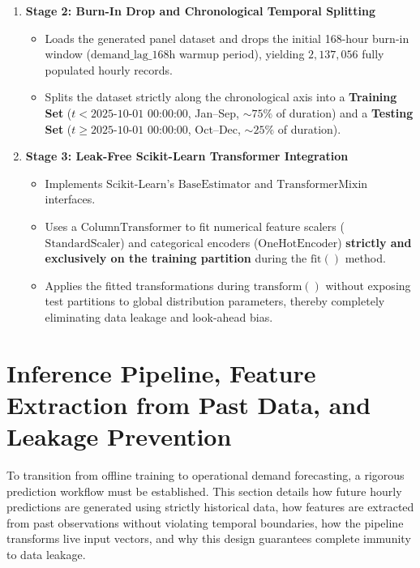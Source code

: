 \documentclass[11pt,a4paper]{article}
\begin{document}
\begin{enumerate}
    \item \textbf{Stage 2: Burn-In Drop and Chronological Temporal Splitting}
    \begin{itemize}
        \item Loads the generated panel dataset and drops the initial 168-hour burn-in window ($\text{demand\_lag\_168h}$ warmup period), yielding $2,137,056$ fully populated hourly records.
        \item Splits the dataset strictly along the chronological axis into a \textbf{Training Set} ($t < \text{2025-10-01 00:00:00}$, Jan--Sep, $\sim 75\%$ of duration) and a \textbf{Testing Set} ($t \ge \text{2025-10-01 00:00:00}$, Oct--Dec, $\sim 25\%$ of duration).
    \end{itemize}
    
    \item \textbf{Stage 3: Leak-Free Scikit-Learn Transformer Integration}
    \begin{itemize}
        \item Implements Scikit-Learn's $\text{BaseEstimator}$ and $\text{TransformerMixin}$ interfaces.
        \item Uses a $\text{ColumnTransformer}$ to fit numerical feature scalers ($\text{StandardScaler}$) and categorical encoders ($\text{OneHotEncoder}$) \textbf{strictly and exclusively on the training partition} during the $\text{fit}()$ method.
        \item Applies the fitted transformations during $\text{transform}()$ without exposing test partitions to global distribution parameters, thereby completely eliminating data leakage and look-ahead bias.
    \end{itemize}
\end{enumerate}

\section{Inference Pipeline, Feature Extraction from Past Data, and Leakage Prevention}
To transition from offline training to operational demand forecasting, a rigorous prediction workflow must be established. This section details how future hourly predictions are generated using strictly historical data, how features are extracted from past observations without violating temporal boundaries, how the pipeline transforms live input vectors, and why this design guarantees complete immunity to data leakage.
\end{document}
